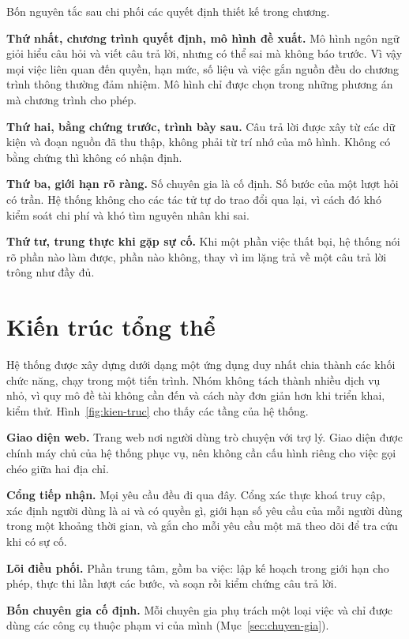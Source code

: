 Bốn nguyên tắc sau chi phối các quyết định thiết kế trong chương.

\textbf{Thứ nhất, chương trình quyết định, mô hình đề xuất.} Mô hình ngôn ngữ giỏi hiểu câu hỏi và viết câu trả lời, nhưng có thể sai mà không báo trước. Vì vậy mọi việc liên quan đến quyền, hạn mức, số liệu và việc gắn nguồn đều do chương trình thông thường đảm nhiệm. Mô hình chỉ được chọn trong những phương án mà chương trình cho phép.

\textbf{Thứ hai, bằng chứng trước, trình bày sau.} Câu trả lời được xây từ các dữ kiện và đoạn nguồn đã thu thập, không phải từ trí nhớ của mô hình. Không có bằng chứng thì không có nhận định.

\textbf{Thứ ba, giới hạn rõ ràng.} Số chuyên gia là cố định. Số bước của một lượt hỏi có trần. Hệ thống không cho các tác tử tự do trao đổi qua lại, vì cách đó khó kiểm soát chi phí và khó tìm nguyên nhân khi sai.

\textbf{Thứ tư, trung thực khi gặp sự cố.} Khi một phần việc thất bại, hệ thống nói rõ phần nào làm được, phần nào không, thay vì im lặng trả về một câu trả lời trông như đầy đủ.

\section{Kiến trúc tổng thể}

Hệ thống được xây dựng dưới dạng một ứng dụng duy nhất chia thành các khối chức năng, chạy trong một tiến trình. Nhóm không tách thành nhiều dịch vụ nhỏ, vì quy mô đề tài không cần đến và cách này đơn giản hơn khi triển khai, kiểm thử. Hình~\ref{fig:kien-truc} cho thấy các tầng của hệ thống.


\textbf{Giao diện web.} Trang web nơi người dùng trò chuyện với trợ lý. Giao diện được chính máy chủ của hệ thống phục vụ, nên không cần cấu hình riêng cho việc gọi chéo giữa hai địa chỉ.

\textbf{Cổng tiếp nhận.} Mọi yêu cầu đều đi qua đây. Cổng xác thực khoá truy cập, xác định người dùng là ai và có quyền gì, giới hạn số yêu cầu của mỗi người dùng trong một khoảng thời gian, và gắn cho mỗi yêu cầu một mã theo dõi để tra cứu khi có sự cố.

\textbf{Lõi điều phối.} Phần trung tâm, gồm ba việc: lập kế hoạch trong giới hạn cho phép, thực thi lần lượt các bước, và soạn rồi kiểm chứng câu trả lời.

\textbf{Bốn chuyên gia cố định.} Mỗi chuyên gia phụ trách một loại việc và chỉ được dùng các công cụ thuộc phạm vi của mình (Mục~\ref{sec:chuyen-gia}).

